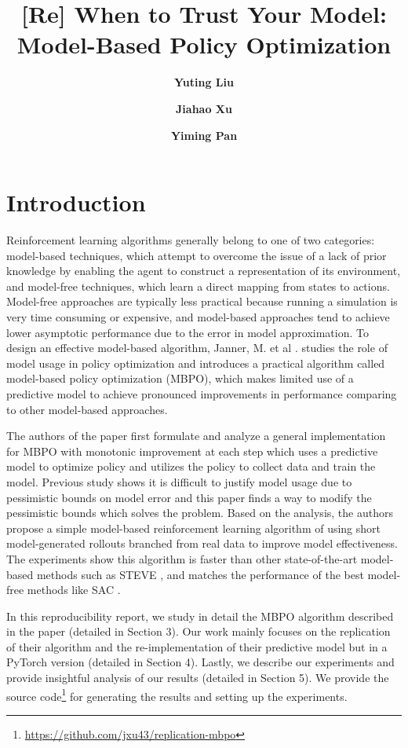 \documentclass{article}
\title{[Re] When to Trust Your Model: Model-Based Policy Optimization}
\author[]{\textbf{Yuting Liu}}
\author[]{\textbf{Jiahao Xu}}
\author[]{\textbf{Yiming Pan}}
\affil{Department of Computer Science, Brown University}
\affil{\{yuting\_liu, jiahao\_xu, yiming\_pan\}@brown.edu}
\begin{document}
\maketitle
\section{Introduction}

Reinforcement learning algorithms generally belong to one of two categories: model-based techniques, which attempt to overcome the issue of a lack of prior knowledge by enabling the agent to construct a representation of its environment, and model-free techniques, which learn a direct mapping from states to actions. Model-free approaches are typically less practical because running a simulation is very time consuming or expensive, and model-based approaches tend to achieve lower asymptotic performance due to the error in model approximation. To design an effective model-based algorithm, Janner, M. et al \cite{ref1}. studies the role of model usage in policy optimization and introduces a practical algorithm called model-based policy optimization (MBPO), which makes limited use of a predictive model to achieve pronounced improvements in performance comparing to other model-based approaches.

The authors of the paper \cite{ref1} first formulate and analyze a general implementation for MBPO with monotonic improvement at each step which uses a predictive model to optimize policy and utilizes the policy to collect data and train the model. Previous study shows it is difficult to justify model usage due to pessimistic bounds on model error and this paper finds a way to modify the pessimistic bounds which solves the problem. Based on the analysis, the authors propose a simple model-based reinforcement learning algorithm of using short model-generated rollouts branched from real data to improve model effectiveness. The experiments show this algorithm is faster than other state-of-the-art model-based methods such as STEVE \cite{ref2}, and matches the performance of the best model-free methods like SAC \cite{ref3}.

In this reproducibility report, we study in detail the MBPO algorithm described in the paper (detailed in Section 3). Our work mainly focuses on the replication of their algorithm and the re-implementation of their predictive model but in a PyTorch version (detailed in Section 4). Lastly, we describe our experiments and provide insightful analysis of our results (detailed in Section 5). We provide the source code\footnote{\url{https://github.com/jxu43/replication-mbpo}} for generating the results and setting up the experiments.
\end{document}
